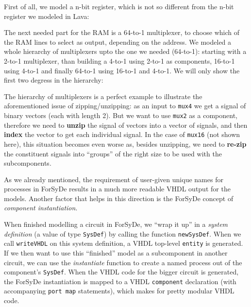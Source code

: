 \documentclass[a4paper]{article}
\begin{document}
                First of all, we model a n-bit register, which is not so different from the n-bit
                register we modeled in Lava:


                The next needed part for the RAM is a 64-to-1 multiplexer, to choose which of the
                RAM lines to select as output, depending on the address. We modeled a whole
                hierarchy of multiplexers upto the one we needed (64-to-1): starting with a 2-to-1
                multiplexer, than building a 4-to-1 using 2-to-1 as components, 16-to-1 using 4-to-1
                and finally 64-to-1 using 16-to-1 and 4-to-1. We will only show the first two
                degress in the hierarchy:


                The hierarchy of multiplexers is a perfect example to illustrate the aforementioned
                issue of zipping/unzipping: as an input to \texttt{mux4} we get a signal of binary
                vectors (each with length 2). But we want to use \texttt{mux2} as a component,
                therefore we need to \textbf{unzip} the signal of vectors into a vector of signals,
                and then \textbf{index} the vector to get each individual signal. In the case of
                \texttt{mux16} (not shown here), this situation becomes even worse as, besides
                unzipping, we need to \textbf{re-zip} the constituent signals into ``groups'' of the
                right size to be used with the subcomponents.

                As we already mentioned, the requirement of user-given unique names for processes in
                ForSyDe results in a much more readable VHDL output for the models. Another factor
                that helps in this direction is the ForSyDe concept of \emph{component
                    instantiation}.

                When finished modelling a circuit in ForSyDe, we ``wrap it up''
                in a \emph{system definition} (a value of type \texttt{SysDef}) by calling the
                function \texttt{newSysDef}. When we call \texttt{writeVHDL} on this system
                definition, a VHDL top-level \texttt{entity} is generated. If we then want to use
                this ``finished'' model as a subcomponent in another circuit, we can use the
                \emph{instantiate} function to create a named process out of the component's
                \texttt{SysDef}. When the VHDL code for the bigger circuit is generated, the ForSyDe
                instantiation is mapped to a VHDL \texttt{component} declaration (with accompanying
                \texttt{port map} statements), which makes for pretty modular VHDL code.
\end{document}
